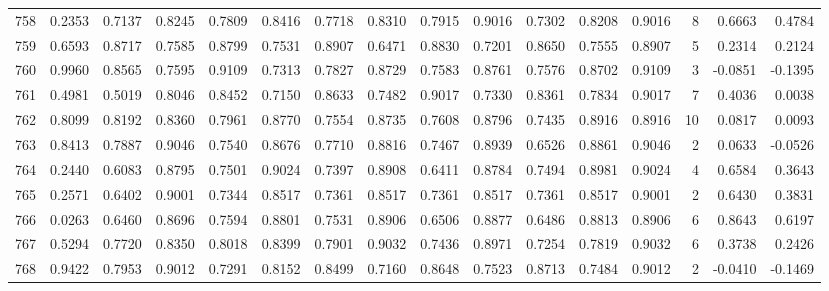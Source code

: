 \begin{tabular}{lrrrrrrrrrrrrrrr}
758 &      0.2353 &  0.7137 &  0.8245 &  0.7809 &  0.8416 &  0.7718 &  0.8310 &  0.7915 &  0.9016 &  0.7302 &   0.8208 &     0.9016 &      8 &                    0.6663 &                     0.4784 \\
759 &      0.6593 &  0.8717 &  0.7585 &  0.8799 &  0.7531 &  0.8907 &  0.6471 &  0.8830 &  0.7201 &  0.8650 &   0.7555 &     0.8907 &      5 &                    0.2314 &                     0.2124 \\
760 &      0.9960 &  0.8565 &  0.7595 &  0.9109 &  0.7313 &  0.7827 &  0.8729 &  0.7583 &  0.8761 &  0.7576 &   0.8702 &     0.9109 &      3 &                   -0.0851 &                    -0.1395 \\
761 &      0.4981 &  0.5019 &  0.8046 &  0.8452 &  0.7150 &  0.8633 &  0.7482 &  0.9017 &  0.7330 &  0.8361 &   0.7834 &     0.9017 &      7 &                    0.4036 &                     0.0038 \\
762 &      0.8099 &  0.8192 &  0.8360 &  0.7961 &  0.8770 &  0.7554 &  0.8735 &  0.7608 &  0.8796 &  0.7435 &   0.8916 &     0.8916 &     10 &                    0.0817 &                     0.0093 \\
763 &      0.8413 &  0.7887 &  0.9046 &  0.7540 &  0.8676 &  0.7710 &  0.8816 &  0.7467 &  0.8939 &  0.6526 &   0.8861 &     0.9046 &      2 &                    0.0633 &                    -0.0526 \\
764 &      0.2440 &  0.6083 &  0.8795 &  0.7501 &  0.9024 &  0.7397 &  0.8908 &  0.6411 &  0.8784 &  0.7494 &   0.8981 &     0.9024 &      4 &                    0.6584 &                     0.3643 \\
765 &      0.2571 &  0.6402 &  0.9001 &  0.7344 &  0.8517 &  0.7361 &  0.8517 &  0.7361 &  0.8517 &  0.7361 &   0.8517 &     0.9001 &      2 &                    0.6430 &                     0.3831 \\
766 &      0.0263 &  0.6460 &  0.8696 &  0.7594 &  0.8801 &  0.7531 &  0.8906 &  0.6506 &  0.8877 &  0.6486 &   0.8813 &     0.8906 &      6 &                    0.8643 &                     0.6197 \\
767 &      0.5294 &  0.7720 &  0.8350 &  0.8018 &  0.8399 &  0.7901 &  0.9032 &  0.7436 &  0.8971 &  0.7254 &   0.7819 &     0.9032 &      6 &                    0.3738 &                     0.2426 \\
768 &      0.9422 &  0.7953 &  0.9012 &  0.7291 &  0.8152 &  0.8499 &  0.7160 &  0.8648 &  0.7523 &  0.8713 &   0.7484 &     0.9012 &      2 &                   -0.0410 &                    -0.1469 \\

\end{tabular}
